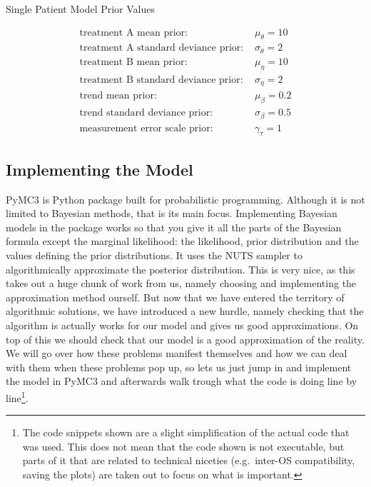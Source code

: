 \documentclass[12pt,a4paper,leqno]{report}
\theoremstyle{plain}
\theoremstyle{definition}
\theoremstyle{remark}
\begin{document}
\begin{table}[H]
    \caption{Single Patient Model Prior Values}\label{singlelpatientmodelpriorvalues}
    \begin{align}\label{}
        \text{treatment A mean prior: } & \mu_{\theta} = 10 \nonumber \\
        \text{treatment A standard deviance prior: } & \sigma_{\theta} = 2 \nonumber \\
        \text{treatment B mean prior: } & \mu_{\eta} = 10 \nonumber \\
        \text{treatment B standard deviance prior: } & \sigma_{\eta} = 2 \nonumber \\
        \text{trend mean prior: } & \mu_{\beta} = 0.2 \nonumber \\
        \text{trend standard deviance prior: } & \sigma_{\beta} = 0.5 \nonumber \\
        \text{measurement error scale prior: } & \gamma_{\tau} = 1 \nonumber
    \end{align}
\end{table}

\subsection{Implementing the Model}

PyMC3 is Python package built for probabilistic programming. Although it is not
limited to Bayesian methods, that is its main focus. Implementing Bayesian models in
the package works so that you give it all the parts of the Bayesian formula except the
marginal likelihood: the likelihood, prior
distribution and the values defining the prior distributions. It uses the NUTS
sampler\cite{nuts} to algorithmically approximate the posterior distribution. This is
very nice, as this takes out a huge chunk of work from us, namely choosing and
implementing the approximation method
ourself. But now that we have entered the territory of algorithmic solutions, we have
introduced a new hurdle, namely checking that the algorithm is actually works for our
model and gives us good approximations. On top of this we should check that our model is a good
approximation of the reality. We will go over how these problems manifest themselves and
how we can deal with them when these problems pop up, so lets us just jump in and
implement the model in PyMC3 and afterwards walk trough what the code is
doing line by line\footnote{The code snippets shown are a
slight simplification of the actual code that was used. This does not mean
that the code shown is not executable, but parts of it that are related to technical niceties
(e.g.\ inter-OS compatibility, saving the plots) are taken out to focus on what is
important.}.
\end{document}
